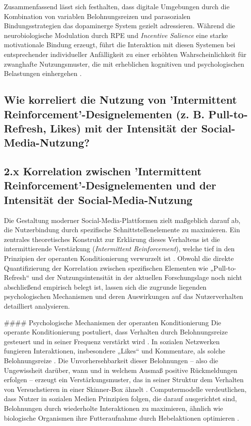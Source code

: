 \documentclass[11pt,a4paper]{article}
\begin{document}
Zusammenfassend lässt sich festhalten, dass digitale Umgebungen durch die Kombination von variablen Belohnungsreizen und parasozialen Bindungsstrategien das dopaminerge System gezielt adressieren. Während die neurobiologische Modulation durch RPE und \textit{Incentive Salience} eine starke motivationale Bindung erzeugt, führt die Interaktion mit diesen Systemen bei entsprechender individueller Anfälligkeit zu einer erhöhten Wahrscheinlichkeit für zwanghafte Nutzungsmuster, die mit erheblichen kognitiven und psychologischen Belastungen einhergehen \autocite{crossref_10_51473_rcmos_v1i2_2025_1736,europepmc_42137086,grey_grey_d4bc9c0d0e8441ba90398520e73af07d,grey_grey_5d5c282590c448fc8776b04f78a08de5}.

\subsection{Wie korreliert die Nutzung von 'Intermittent Reinforcement'-Designelementen (z. B. Pull-to-Refresh, Likes) mit der Intensität der Social-Media-Nutzung?}

\subsection{2.x Korrelation zwischen 'Intermittent Reinforcement'-Designelementen und der Intensität der Social-Media-Nutzung}

Die Gestaltung moderner Social-Media-Plattformen zielt maßgeblich darauf ab, die Nutzerbindung durch spezifische Schnittstellenelemente zu maximieren. Ein zentrales theoretisches Konstrukt zur Erklärung dieses Verhaltens ist die intermittierende Verstärkung (\textit{Intermittent Reinforcement}), welche tief in den Prinzipien der operanten Konditionierung verwurzelt ist \autocite{grey_grey_9a2c6313091c4469b0e8c2853f47a56d}. Obwohl die direkte Quantifizierung der Korrelation zwischen spezifischen Elementen wie „Pull-to-Refresh“ und der Nutzungsintensität in der aktuellen Forschungslage noch nicht abschließend empirisch belegt ist, lassen sich die zugrunde liegenden psychologischen Mechanismen und deren Auswirkungen auf das Nutzerverhalten detailliert analysieren.

\#\#\#\# Psychologische Mechanismen der operanten Konditionierung Die operante Konditionierung postuliert, dass Verhalten durch Belohnungsreize gesteuert und in seiner Frequenz verstärkt wird \autocite{grey_grey_9a2c6313091c4469b0e8c2853f47a56d}. In sozialen Netzwerken fungieren Interaktionen, insbesondere „Likes“ und Kommentare, als solche Belohnungsreize \autocite{grey_grey_9a2c6313091c4469b0e8c2853f47a56d}. Die Unvorhersehbarkeit dieser Belohnungen – also die Ungewissheit darüber, wann und in welchem Ausmaß positive Rückmeldungen erfolgen – erzeugt ein Verstärkungsmuster, das in seiner Struktur dem Verhalten von Versuchstieren in einer Skinner-Box ähnelt \autocite{grey_grey_9a2c6313091c4469b0e8c2853f47a56d}. Computermodelle verdeutlichen, dass Nutzer in sozialen Medien Prinzipien folgen, die darauf ausgerichtet sind, Belohnungen durch wiederholte Interaktionen zu maximieren, ähnlich wie biologische Organismen ihre Futteraufnahme durch Hebelaktionen optimieren \autocite{grey_grey_9a2c6313091c4469b0e8c2853f47a56d}.
\end{document}
